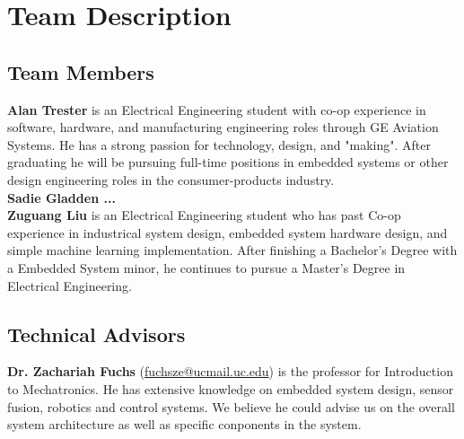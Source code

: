 \chapter{Team Description}

\section{Team Members}
	
	\textbf{Alan Trester} is an Electrical Engineering student with co-op experience in software, hardware, and manufacturing engineering roles through GE Aviation Systems. He has a strong passion for technology, design, and "making". After graduating he will be pursuing full-time positions in embedded systems or other design engineering roles in the consumer-products industry.\\
	
	\textbf{Sadie Gladden ...} \\
	
	\textbf{Zuguang Liu} is an Electrical Engineering student who has past Co-op experience in industrical system design, embedded system hardware design, and simple machine learning implementation. After finishing a Bachelor's Degree with a Embedded System minor, he continues to pursue a Master's Degree in Electrical Engineering. 
	
\section{Technical Advisors} 
	
	\textbf{Dr. Zachariah Fuchs} (\href{fuchsze@ucmail.uc.edu}{fuchsze@ucmail.uc.edu}) is the professor for Introduction to Mechatronics. He has extensive knowledge on embedded system design, sensor fusion, robotics and control systems. We believe he could advise us on the overall system architecture as well as specific conponents in the system. \\
	

	